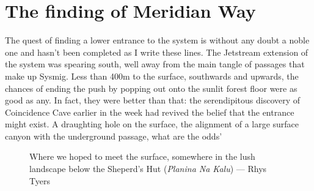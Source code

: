 \section{The finding of Meridian Way} 
\begin{marginfigure}
\end{marginfigure}

The quest of finding a lower entrance to the system is without any doubt a noble one and hasn't been completed as I write these lines. The Jetstream extension of the system was spearing south, well away from the main tangle of passages that make up Sysmig. Less than 400m to the surface, southwards and upwards, the chances of ending the push by popping out onto the sunlit forest floor were as good as any. In fact, they were better than that: the serendipitous discovery of Coincidence Cave earlier in the week had revived the belief that the entrance might exist. A draughting hole on the surface, the alignment of a large surface canyon with the underground passage, what are the odds' 


\begin{figure}[b!]
\checkoddpage \ifoddpage \forcerectofloat \else \forceversofloat \fi
\centering
{}
\caption{Where we hoped to meet the surface, somewhere in the lush landscape below the Sheperd's Hut (\emph{Planina Na Kalu}) --- Rhys Tyers}
\label{Notebook}
\end{figure}

